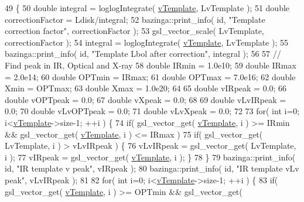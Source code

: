 \begin{DoxyCode}
49                                    \{
50   \textcolor{keywordtype}{double} integral = loglogIntegrate( \hyperlink{classQuasarAccDisk_a9ec136403f3df7f3a2582968a28fdfcb}{vTemplate}, LvTemplate );
51   \textcolor{keywordtype}{double} correctionFactor = Ldisk/integral;
52   bazinga::print\_info( \textcolor{keywordtype}{id}, \textcolor{stringliteral}{"Template correction factor"}, correctionFactor );
53   gsl\_vector\_scale( LvTemplate, correctionFactor );
54   integral = loglogIntegrate( \hyperlink{classQuasarAccDisk_a9ec136403f3df7f3a2582968a28fdfcb}{vTemplate}, LvTemplate );
55   bazinga::print\_info( \textcolor{keywordtype}{id}, \textcolor{stringliteral}{"Template Lbol after correction"}, integral );
56   
57   \textcolor{comment}{// Find peak in IR, Optical and X-ray}
58   \textcolor{keywordtype}{double} IRmin = 1.0e10;
59   \textcolor{keywordtype}{double} IRmax = 2.0e14;
60   \textcolor{keywordtype}{double} OPTmin = IRmax;
61   \textcolor{keywordtype}{double} OPTmax = 7.0e16;
62   \textcolor{keywordtype}{double} Xmin = OPTmax;
63   \textcolor{keywordtype}{double} Xmax = 1.0e20;
64 
65   \textcolor{keywordtype}{double} vIRpeak = 0.0;
66   \textcolor{keywordtype}{double} vOPTpeak = 0.0;
67   \textcolor{keywordtype}{double} vXpeak = 0.0;
68 
69   \textcolor{keywordtype}{double} vLvIRpeak = 0.0;
70   \textcolor{keywordtype}{double} vLvOPTpeak = 0.0;
71   \textcolor{keywordtype}{double} vLvXpeak = 0.0;
72   
73   \textcolor{keywordflow}{for}( \textcolor{keywordtype}{int} i=0; i<\hyperlink{classQuasarAccDisk_a9ec136403f3df7f3a2582968a28fdfcb}{vTemplate}->size-1; ++i ) \{
74     \textcolor{keywordflow}{if}( gsl\_vector\_get( \hyperlink{classQuasarAccDisk_a9ec136403f3df7f3a2582968a28fdfcb}{vTemplate}, i ) >= IRmin && gsl\_vector\_get( 
      \hyperlink{classQuasarAccDisk_a9ec136403f3df7f3a2582968a28fdfcb}{vTemplate}, i ) <= IRmax )
75       \textcolor{keywordflow}{if}( gsl\_vector\_get( LvTemplate, i ) > vLvIRpeak ) \{
76     vLvIRpeak = gsl\_vector\_get( LvTemplate, i );
77     vIRpeak = gsl\_vector\_get( \hyperlink{classQuasarAccDisk_a9ec136403f3df7f3a2582968a28fdfcb}{vTemplate}, i ); \}
78   \}
79   bazinga::print\_info( \textcolor{keywordtype}{id}, \textcolor{stringliteral}{"IR template v peak"}, vIRpeak );
80   bazinga::print\_info( \textcolor{keywordtype}{id}, \textcolor{stringliteral}{"IR template vLv peak"}, vLvIRpeak );
81 
82   \textcolor{keywordflow}{for}( \textcolor{keywordtype}{int} i=0; i<\hyperlink{classQuasarAccDisk_a9ec136403f3df7f3a2582968a28fdfcb}{vTemplate}->size-1; ++i ) \{
83     \textcolor{keywordflow}{if}( gsl\_vector\_get( \hyperlink{classQuasarAccDisk_a9ec136403f3df7f3a2582968a28fdfcb}{vTemplate}, i ) >= OPTmin && gsl\_vector\_get( 

\end{DoxyCode}
